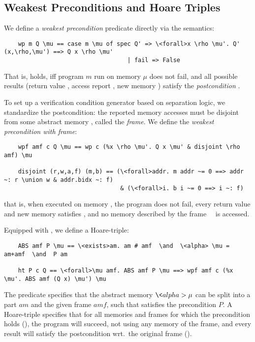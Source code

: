 \documentclass[sn-mathphys,Numbered]{sn-jnl}
\theoremstyle{thmstyleone}%
\theoremstyle{definition}%
\theoremstyle{thmstylethree}%
\begin{document}
  \subsection{Weakest Preconditions and Hoare Triples}\label{sec:wp_hoare}
  We define a \emph{weakest precondition} predicate directly via the semantics:
  \begin{lstlisting}
    wp m Q \mu == case m \mu of spec Q' => \<forall>x \rho \mu'. Q' (x,\rho,\mu') ==> Q x \rho \mu'
                                   | fail => False
  \end{lstlisting}
  That is,  holds, iff program \is$m$ run on memory \is$\mu$ does not fail, and all possible results (return value , access report \is{\rho}, new memory )
  satisfy the \emph{postcondition} .

  To set up a verification condition generator based on separation logic,
  we standardize the postcondition: the reported memory accesses must be disjoint
  from some abstract memory , called the \emph{frame}. We define the
  \emph{weakest precondition with frame}:
  \begin{lstlisting}
    wpf amf c Q \mu == wp c (%x \rho \mu'. Q x \mu' & disjoint \rho amf) \mu

    disjoint (r,w,a,f) (m,b) == (\<forall>addr. m addr ~= 0 ==> addr ~: r \union w & addr.bidx ~: f)
                                 & (\<forall>i. b i ~= 0 ==> i ~: f)
  \end{lstlisting}
  that is, when executed on memory \is{\mu}, the program  does not fail, every return value  and new memory  satisfies ,
  and no memory described by the frame ~~is accessed.

  Equipped with , we define a Hoare-triple:
  \begin{lstlisting}
    ABS amf P \mu == \<exists>am. am # amf  \and  \<alpha> \mu = am+amf  \and  P am

    ht P c Q == \<forall>\mu amf. ABS amf P \mu ==> wpf amf c (%x \mu'. ABS amf (Q x) \mu') \mu
  \end{lstlisting}
  The predicate  specifies that the abstract memory \is$\<alpha> \mu$ can be
  split into a part \is$am$ and the given frame \is$amf$, such that  satisfies the precondition $P$.
  A Hoare-triple  specifies that for all memories and frames
  for which the precondition holds (), the program will succeed,
  not using any memory of the frame, and every result will satisfy the postcondition
  wrt.\ the original frame ().
\end{document}
